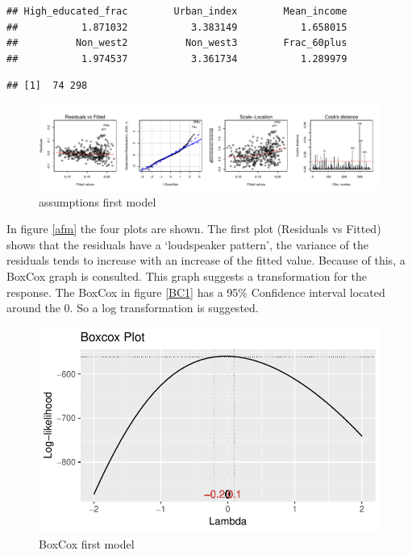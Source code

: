 \documentclass[11pt,]{article}
\begin{document}
\begin{verbatim}
## High_educated_frac        Urban_index        Mean_income 
##           1.871032           3.383149           1.658015 
##          Non_west2          Non_west3        Frac_60plus 
##           1.974537           3.361734           1.289979
\end{verbatim}

\begin{verbatim}
## [1]  74 298
\end{verbatim}

\begin{figure}[H]

{\centering \includegraphics{Report_files/figure-latex/unnamed-chunk-8-1} 

}

\caption{\label{afm}assumptions first model}\label{fig:unnamed-chunk-8}
\end{figure}

In figure \ref{afm} the four plots are shown. The first plot (Residuals
vs Fitted) shows that the residuals have a `loudspeaker pattern', the
variance of the residuals tends to increase with an increase of the
fitted value. Because of this, a BoxCox graph is consulted. This graph
suggests a transformation for the response. The BoxCox in figure
\ref{BC1} has a 95\% Confidence interval located around the 0. So a log
transformation is suggested.

\begin{figure}[H]

{\centering \includegraphics{Report_files/figure-latex/unnamed-chunk-9-1} 

}

\caption{\label{BC1}BoxCox first model}\label{fig:unnamed-chunk-9}
\end{figure}
\end{document}
